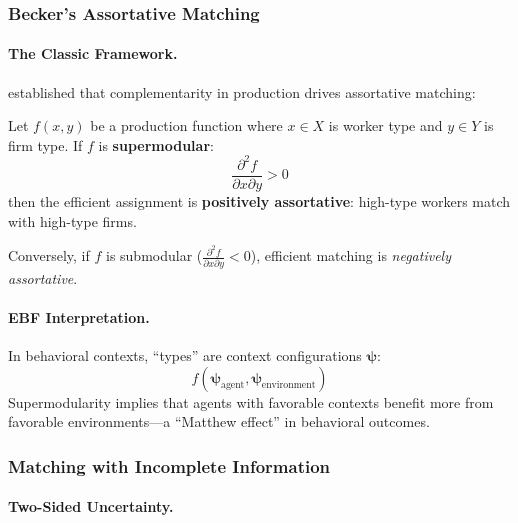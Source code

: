 \subsubsection{Becker's Assortative Matching}

\paragraph{The Classic Framework.}

\citet{PAP-becker1973theory} established that complementarity in production drives 
assortative matching:

\begin{theorem}
\label{thm:becker}
Let $f(x, y)$ be a production function where $x \in X$ is worker type and $y \in Y$ 
is firm type. If $f$ is \textbf{supermodular}:
\begin{equation}
\frac{\partial^2 f}{\partial x \partial y} > 0
\end{equation}
then the efficient assignment is \textbf{positively assortative}: high-type workers 
match with high-type firms.
\end{theorem}

Conversely, if $f$ is submodular ($\frac{\partial^2 f}{\partial x \partial y} < 0$), 
efficient matching is \emph{negatively assortative}.

\paragraph{EBF Interpretation.}

In behavioral contexts, ``types'' are context configurations $\boldsymbol{\psi}$:
\begin{equation}
f(\boldsymbol{\psi}_{\text{agent}}, \boldsymbol{\psi}_{\text{environment}})
\end{equation}
Supermodularity implies that agents with favorable contexts benefit more from 
favorable environments---a ``Matthew effect'' in behavioral outcomes.

\subsubsection{Matching with Incomplete Information}

\paragraph{Two-Sided Uncertainty.}

